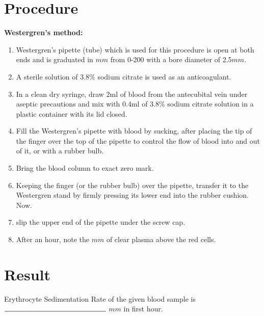 \documentclass[a4paper,12pt,openany,twoside]{book}
\begin{document}
												\section*{Procedure}
												\textbf{Westergren’s method:}\newline
												\begin{enumerate}	
													\item{Westergren’s pipette (tube) which is used for this procedure is open at both ends and is graduated in $mm$ from 0-200 with a bore diameter of 2.5$mm$.}
													\item{A sterile solution of 3.8\% sodium citrate is used as an anticoagulant.}
													\item{In a clean dry syringe, draw 2ml of blood from the antecubital vein under aseptic precautions and mix with 0.4ml of 3.8\% sodium citrate solution in a plastic  container with its lid closed.}
													\item{Fill the Westergren’s pipette with blood by sucking, after placing the tip of the finger over the top of the pipette to control the flow of blood into and out of it, or with a rubber bulb.}
													\item{Bring the blood column to exact zero mark.}
													\item{Keeping the finger (or the rubber bulb) over the pipette, transfer it to the Westergren stand by firmly pressing its lower end into the rubber cushion. Now.}
													\item{slip the upper end of the pipette under the screw cap.}
													\item{After an hour, note the $mm$ of clear plasma above the red cells.}
												\end{enumerate}
												\section*{Result}
												Erythrocyte Sedimentation Rate of the given blood sample is $\rule{5cm}{0.5pt}$ $mm$ in first hour.
\end{document}
